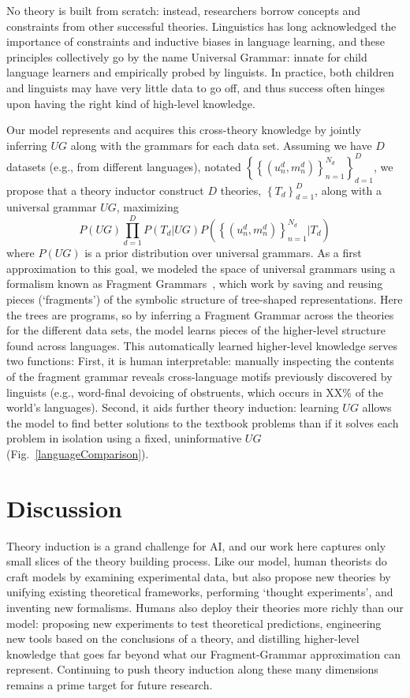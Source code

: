 \documentclass[12pt]{article}
\begin{document}
No theory is built from scratch: instead, researchers borrow concepts
and constraints from other successful theories.  Linguistics has long
acknowledged the importance of constraints and inductive biases in
language learning, and these principles collectively go by the name
Universal Grammar: innate for child language learners and 
empirically probed by linguists.
In practice,
both children and linguists
may have very little data to go off,
and thus success often hinges upon
having the right kind of high-level knowledge.

Our model represents and acquires this cross-theory knowledge
by jointly inferring $UG$ along with the grammars for each data set.
Assuming we have $D$ datasets (e.g., from different languages),
notated $\left\{\left\{(u_n^d,m_n^d) \right\}_{n = 1}^{N_d} \right\}_{d = 1}^D$,
we propose that a
theory inductor construct $D$ theories, $\left\{T_d \right\}_{d = 1}^D$,
along with a universal grammar $UG$, maximizing
$$
P(UG)\prod_{d = 1}^D P(T_d|UG)P(\left\{(u_n^d,m_n^d) \right\}_{n = 1}^{N_d}|T_d)
$$
where $P(UG)$ is a prior distribution over universal grammars.
As a first approximation to this goal,
we modeled the space of universal grammars
using a formalism known as Fragment Grammars~\cite{tim},
which work by saving and reusing pieces (`fragments')
of the symbolic structure of tree-shaped representations.
Here the trees are programs,
so by inferring a Fragment Grammar across the theories for the different data sets,
the model learns
pieces of the higher-level structure
found across languages.
This automatically learned higher-level knowledge
serves two functions:
First, it is human interpretable:
manually inspecting the contents of the fragment grammar reveals
cross-language motifs previously discovered by linguists (e.g., word-final devoicing of obstruents,
which occurs in XX\% of the world's languages).
Second,
it aids further theory induction:
learning $UG$ allows the model to
find better solutions to the textbook problems than if it solves
each problem in isolation using a fixed,
uninformative $UG$ (Fig.~\ref{languageComparison}).



\section*{Discussion}

Theory induction is a grand challenge for AI,
and our work here
captures only small slices of
the theory building process.
Like our model, human theorists
do craft models
by examining experimental data,
but also propose new theories by
unifying existing theoretical frameworks,
performing `thought experiments',
and inventing new formalisms.
Humans also deploy their theories more richly than our model:
proposing new experiments to test theoretical predictions,
engineering new tools based on the conclusions of a theory,
and distilling higher-level knowledge that goes far beyond what our
Fragment-Grammar approximation can represent.
Continuing to push theory induction along these many dimensions 
remains a prime target for future research.
\end{document}
